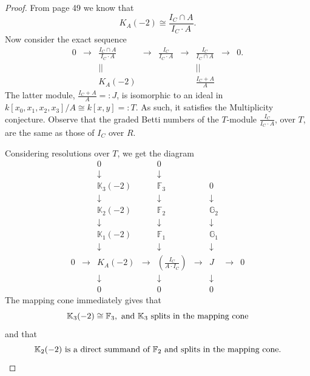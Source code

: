 \documentclass[12pt,twoside]{amsart}
\numberwithin{equation}{section}
\theoremstyle{definition}
\begin{document}
\begin{proof}

From \cite{migbook} page 49 we know that
\[
K_A(-2) \cong \frac{I_C \cap A}{I_C \cdot A}.
\]
Now consider the exact sequence
\begin{equation} \label{ses}
\begin{array}{cccccccccccccccc}
0 & \rightarrow & \displaystyle \frac{I_C \cap A}{I_C \cdot A} & \rightarrow &
\displaystyle \frac{I_C}{I_C
\cdot A} & \rightarrow & \displaystyle \frac{I_C}{I_C \cap A} &
\rightarrow & 0.  \\
&& || &&&& || \\
&& K_A(-2) && && \displaystyle \frac{I_C + A}{A}
\end{array}
\end{equation}
The latter module, $\frac{I_C + A}{A} =: J$, is isomorphic to an ideal in
$k[x_0,x_1,x_2,x_3]/A \cong k[x,y] =: T$.  As such, it satisfies the Multiplicity
conjecture.  Observe that the graded Betti numbers of the $T$-module $\frac{I_C}{I_C
\cdot A}$, over $T$, are the same as those of $I_C$ over $R$.

Considering resolutions over $T$, we get the diagram
\begin{equation} \label{diag}
\begin{array}{cccccccccccccccc}
&& 0 && 0 \\
&& \downarrow && \downarrow \\
&& {\mathbb K}_3 (-2) && {\mathbb F}_3 && 0 \\
&& \downarrow && \downarrow && \downarrow \\
&& {\mathbb K}_2 (-2) &&  {\mathbb F}_2 && {\mathbb G}_2 \\
&& \downarrow && \downarrow && \downarrow \\
&& {\mathbb K}_1(-2) && {\mathbb F}_1 && {\mathbb G}_1 \\
&& \downarrow && \downarrow && \downarrow \\
0 & \rightarrow & K_A(-2) & \rightarrow & \displaystyle \left ( \frac{I_C}{A
\cdot I_C}
\right ) & \rightarrow & J & \rightarrow & 0 \\
&& \downarrow && \downarrow && \downarrow \\
&& 0 && 0 && 0
\end{array}
\end{equation}
The mapping cone immediately gives that
\[
{\mathbb K}_3 (-2) \cong {\mathbb F}_3, \hbox{ and ${\mathbb K}_3$ splits in the
mapping cone}
\]
and that
\begin{equation} \label{summand}
{\mathbb K}_2 (-2) \hbox{ is a direct summand of ${\mathbb F}_2$ and splits in
the mapping cone}.
\end{equation}


\end{proof}
\end{document}
